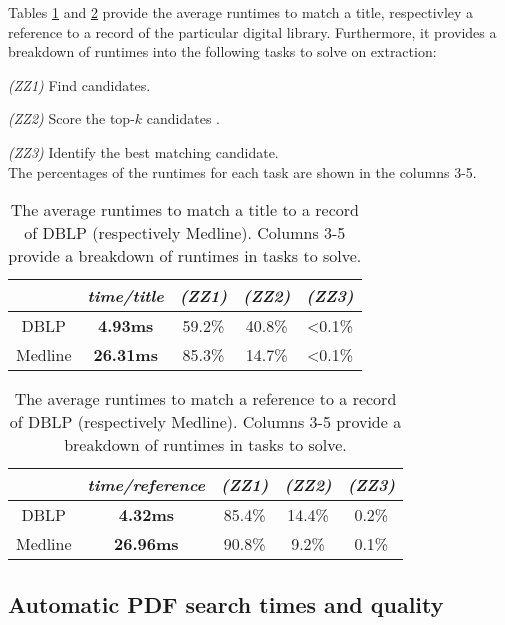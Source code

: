 Tables \ref{table:title-matching-runtimes} and  \ref{table:references-matching-runtimes} provide the average runtimes to match a title, respectivley a reference to a record of the particular digital library. Furthermore, it provides a breakdown of runtimes into the following tasks to solve on extraction:
\par\medskip\noindent
\textit{(ZZ1)} Find candidates.
\par\medskip\noindent
\textit{(ZZ2)} Score the top-$k$ candidates .
\par\medskip\noindent
\textit{(ZZ3)} Identify the best matching candidate. 
\medskip \\
The percentages of the runtimes for each task are shown in the columns 3-5. 

\vspace{-1mm}
\begin{table}[ht]
\centering
{\renewcommand{\baselinestretch}{1.3}\normalsize
\hspace*{-2.5mm}
\begin{tabular}{|c|c|ccc|} \hline
&  \textit{\textbf{time/title}} & \textit{(ZZ1)} & \textit{(ZZ2)} & \textit{(ZZ3)} \\ \hline
DBLP    & \textbf{4.93ms} & 59.2\% & 40.8\% & <0.1\% \\
Medline & \textbf{26.31ms} & 85.3\% & 14.7\% & <0.1\% \\ \hline
\end{tabular}}
\vspace{-3mm}
\caption{The average runtimes to match a title to a record of DBLP (respectively Medline). Columns 3-5 provide a breakdown of runtimes in tasks to solve.}
\label{table:title-matching-runtimes}
\vspace{-2mm}
\end{table}

\vspace{-1mm}
\begin{table}[!ht]
\centering
{\renewcommand{\baselinestretch}{1.3}\normalsize
\hspace*{-2.5mm}
\begin{tabular}{|c|c|ccc|} \hline
&  \textit{\textbf{time/reference}} & \textit{(ZZ1)} & \textit{(ZZ2)} & \textit{(ZZ3)} \\ \hline
DBLP    & \textbf{4.32ms} & 85.4\% & 14.4\% & 0.2\% \\
Medline & \textbf{26.96ms} & 90.8\% & 9.2\% & 0.1\% \\ \hline
\end{tabular}}
\vspace{-3mm}
\caption{The average runtimes to match a reference to a record of DBLP (respectively Medline). Columns 3-5 provide a breakdown of runtimes in tasks to solve.}
\label{table:references-matching-runtimes}
\vspace{-2mm}
\end{table}

\subsection{Automatic PDF search times and quality} \label{sec:experiments_automaticsearch}
